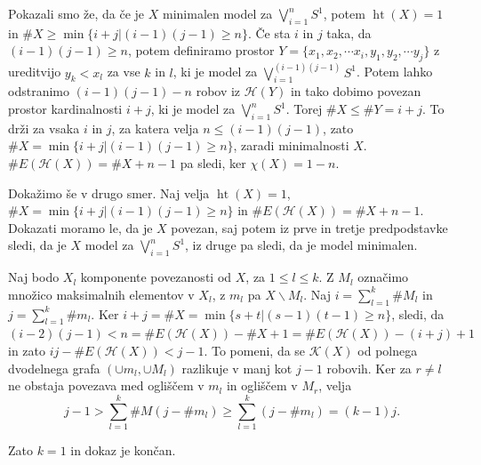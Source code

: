 \documentclass[mat1]{fmfdelo}
\DeclareRobustCommand{\h}{
    \mathcal{H}}
\DeclareMathOperator*{\htt}{ht}
\begin{document}
\begin{dokaz}
    Pokazali smo že, da če je $X$ minimalen model za $\bigvee\limits_{i=1}^{n}S^1$, potem $\htt(X)=1$ in $\#X\geq\min\{i+j|(i-1)(j-1)\geq n\}$. 
    Če sta $i$ in $j$ taka, da $(i-1)(j-1)\geq n$, potem definiramo prostor $Y=\{x_1,x_2, \cdots x_i,y_1,y_2, \cdots y_j\}$ z ureditvijo $y_k<x_l$ 
    za vse $k$ in $l$, ki je model za $\bigvee\limits_{i=1}^{(i-1)(j-1)}S^1$. Potem lahko odstranimo $(i-1)(j-1)-n$ robov iz $\h(Y)$ in tako dobimo povezan prostor kardinalnosti $i+j$, ki je model za $\bigvee\limits_{i=1}^{n}S^1$. Torej $\#X\leq \#Y=i+j$. To drži za vsaka $i$ in $j$, za katera velja $n\leq (i-1)(j-1)$, zato $\#X=\min\{i+j|(i-1)(j-1)\geq n\}$, zaradi minimalnosti $X$. $\#E(\h(X))= \#X + n -1$ pa sledi, ker $\chi(X)= 1-n$.

    Dokažimo še v drugo smer. Naj velja  $\htt(X)=1$, $\#X=\min\{i+j|(i-1)(j-1)\geq n\}$ in $\#E(\h(X))= \#X + n -1.$ Dokazati moramo le, da je $X$ povezan, saj potem iz prve in tretje predpodstavke sledi, da je $X$ model za  $\bigvee\limits_{i=1}^{n}S^1$, iz druge pa sledi, da je model minimalen.

    Naj bodo $X_l$ komponente povezanosti od $X$, za $1\leq l \leq k$. Z $M_l$ označimo množico maksimalnih elementov v $X_l$, z $m_l$ pa $X\backslash M_l$. Naj $i= \sum\limits_{l=1}^k \# M_l$ in $j= \sum\limits_{l=1}^k \# m_l$. Ker $i+j=\# X =\min \{s+t|(s-1)(t-1)\geq n\}$, sledi, da $(i-2)(j-1)<n=\# E(\h(X))-\# X +1=\#E(\h(X)) -(i+j) +1$ in zato $ij -\# E(\h(X))<j-1$. To pomeni, da se $\mathcal{K}(X)$ od polnega dvodelnega grafa $(\cup m_l,\cup M_l)$
    razlikuje v manj kot $j-1$ robovih. Ker za $r\neq l$ ne obstaja povezava med ogliščem v $m_l$ in ogliščem v $M_r$, velja
    $$
        j-1>\sum\limits_{l=1}^{k}\# M(j- \# m_l)\geq \sum\limits_{l=1}^{k}(j- \# m_l)=(k-1)j.
    $$

    Zato $k=1$ in dokaz je končan.
\end{dokaz}
\end{document}
